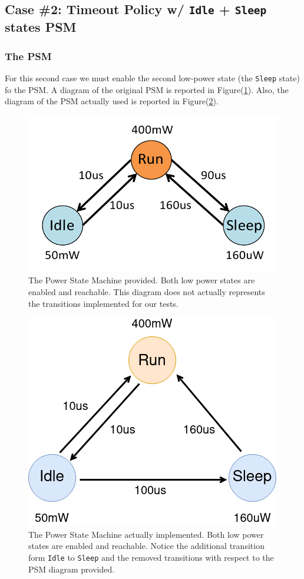 \documentclass[a4paper]{article}
\begin{document}
    \subsection{Case \#2: Timeout Policy w/ \texttt{Idle} + \texttt{Sleep} states PSM}
        \subsubsection{The PSM}
            For this second case we must enable the second low-power state (the \texttt{Sleep} state) fo the PSM. A diagram of the original PSM is reported in Figure(\ref{fig:PSM_case2}).
            Also, the diagram of the PSM actually used is reported in Figure(\ref{fig:PSM_case3}).

            \begin{figure}[htp]
                \centering
                \includegraphics[width=0.35 \columnwidth]{./screenshots/PSM_case2.png}
                \caption{
                        \label{fig:PSM_case2}
                        The Power State Machine provided. Both low power states are enabled and reachable. This diagram does not actually represents the transitions implemented for our tests.
                }
            \end{figure}

            \begin{figure}[htp]
                \centering
                \includegraphics[width=0.35 \columnwidth]{./screenshots/PSM_case3.png}
                \caption{
                        \label{fig:PSM_case3}
                        The Power State Machine actually implemented. Both low power states are enabled and reachable. Notice the additional transition form \texttt{Idle} to \texttt{Sleep} and the removed transitions with respect to the PSM diagram provided.
                }
            \end{figure}
\end{document}
